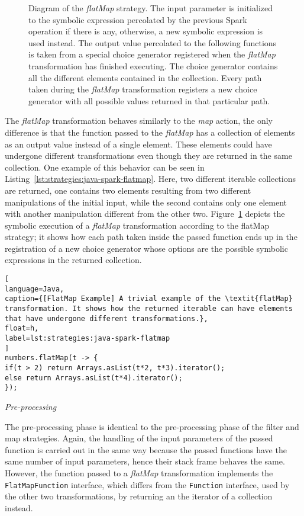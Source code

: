 \begin{figure}[t]
\begin{tikzpicture}[node distance=2cm, auto]
	
	\end{tikzpicture}
	\caption[Diagram of the \textit{flatMap} Strategy]{Diagram of the \textit{flatMap} strategy. The input parameter is initialized to the symbolic expression percolated by the previous Spark operation if there is any, otherwise, a new symbolic expression is used instead. The output value percolated to the following functions is taken from a special choice generator registered when the \textit{flatMap} transformation has finished executing. The choice generator contains all the different elements contained in the collection. Every path taken during the \textit{flatMap} transformation registers a new choice generator with all possible values returned in that particular path.}
	\label{fig:strategies:flatMap}
\end{figure}

The \textit{flatMap} transformation behaves similarly to the \textit{map} action, the only difference is that the function passed to the \textit{flatMap} has a collection of elements as an output value instead of a single element. These elements could have undergone different transformations even though they are returned in the same collection. One example of this behavior can be seen in Listing~\ref{lst:strategies:java-spark-flatmap}. Here, two different iterable collections are returned, one contains two elements resulting from two different manipulations of the initial input, while the second contains only one element with another manipulation different from the other two. Figure~\ref{fig:strategies:flatMap} depicts the symbolic execution of a \textit{flatMap} transformation according to the flatMap strategy; it shows how each path taken inside the passed function ends up in the registration of a new choice generator whose options are the possible symbolic expressions in the returned collection.

\begin{lstlisting}[
language=Java,
caption={[FlatMap Example] A trivial example of the \textit{flatMap} transformation. It shows how the returned iterable can have elements that have undergone different transformations.},
float=h,
label=lst:strategies:java-spark-flatmap
]
numbers.flatMap(t -> {				
if(t > 2) return Arrays.asList(t*2, t*3).iterator();
else return Arrays.asList(t*4).iterator();				
});
\end{lstlisting}

\textit{Pre-processing}

The pre-processing phase is identical to the pre-processing phase of the filter and map strategies. Again, the handling of the input parameters of the passed function is carried out in the same way because the passed functions have the same number of input parameters, hence their stack frame behaves the same. However, the function passed to a \textit{flatMap} transformation implements the \texttt{FlatMapFunction} interface, which differs from the \texttt{Function} interface, used by the other two transformations, by returning an the iterator of a collection instead.

